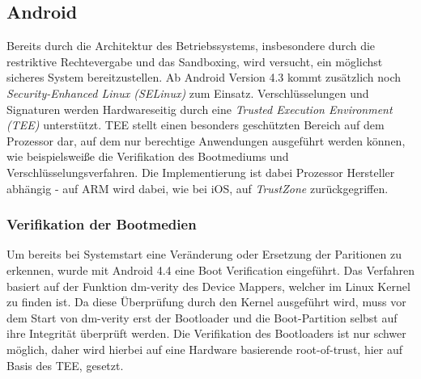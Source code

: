 \subsection{Android}

	Bereits durch die Architektur des Betriebssystems, insbesondere durch die restriktive Rechtevergabe und das Sandboxing, wird versucht, ein möglichst sicheres System bereitzustellen. Ab Android Version 4.3 kommt zusätzlich noch \textit{Security-Enhanced Linux (SELinux)} zum Einsatz. Verschlüsselungen und Signaturen werden Hardwareseitig durch eine \textit{Trusted Execution Environment (TEE)} unterstützt. TEE stellt einen besonders geschützten Bereich auf dem Prozessor dar, auf dem nur berechtige Anwendungen ausgeführt werden können, wie beispielsweiße die Verifikation des Bootmediums und Verschlüsselungsverfahren. Die Implementierung ist dabei Prozessor Hersteller abhängig - auf ARM wird dabei, wie bei iOS, auf \textit{TrustZone}\cite{TEE_ARM} zurückgegriffen.
	
	\subsubsection{Verifikation der Bootmedien}
	\label{sec:VerifikationDerBootmedien} Um bereits bei Systemstart eine Veränderung oder Ersetzung der Paritionen zu erkennen, wurde mit Android 4.4 eine Boot Verification eingeführt. Das Verfahren basiert auf der Funktion dm-verity des Device Mappers, welcher im Linux Kernel zu finden ist. Da diese Überprüfung durch den Kernel ausgeführt wird, muss vor dem Start von dm-verity erst der Bootloader und die Boot-Partition selbst auf ihre Integrität überprüft werden.
	Die Verifikation des Bootloaders ist nur schwer möglich, daher wird hierbei auf eine Hardware basierende root-of-trust, hier auf Basis des TEE, gesetzt. 
	
